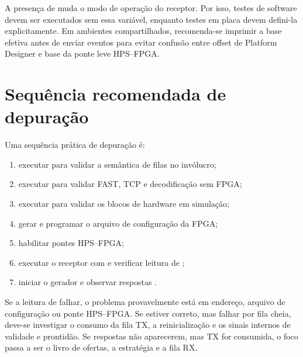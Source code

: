 A presença de  muda o modo de operação do receptor. Por isso, testes de software devem ser executados sem essa variável, enquanto testes em placa devem defini-la explicitamente. Em ambientes compartilhados, recomenda-se imprimir a base efetiva antes de enviar eventos para evitar confusão entre offset de Platform Designer e base da ponte leve HPS--FPGA.

\section{Sequência recomendada de depuração}\label{sec:apendiceDebug}

Uma sequência prática de depuração é:

\begin{enumerate}
  \item executar  para validar a semântica de filas no invólucro;
  \item executar  para validar FAST, TCP e decodificação sem FPGA;
  \item executar  para validar os blocos de hardware em simulação;
  \item gerar e programar o arquivo de configuração da FPGA;
  \item habilitar pontes HPS--FPGA;
  \item executar o receptor com  e verificar leitura de ;
  \item iniciar o gerador e observar respostas .
\end{enumerate}

Se a leitura de  falhar, o problema provavelmente está em endereço, arquivo de configuração ou ponte HPS--FPGA. Se  estiver correto, mas  falhar por fila cheia, deve-se investigar o consumo da fila TX, a reinicialização e os sinais internos de validade e prontidão. Se respostas não aparecerem, mas TX for consumida, o foco passa a ser o livro de ofertas, a estratégia e a fila RX.
